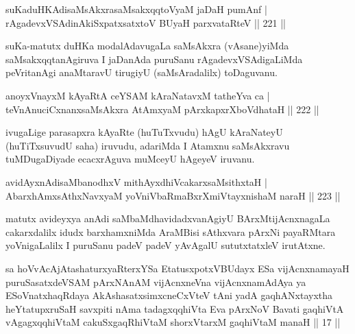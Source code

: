 
\begin{shl}
suKaduHKAdisaMsAkxrasaMsakxqqtoV\s yaM jaDaH pumAnf |\\
rAgadevxVSAdinA\s \s kiSxpatxsatxtoV BUyaH parxvataRteV \hfill || 221 ||
\end{shl}

\begin{artha}
suKa-matutx duHKa modalAdavugaLa saMsAkxra (vAsane)yiMda saMsakxqqtanAgiruva I jaDanAda puruSanu rAgadevxVSAdigaLiMda peVritanAgi anaMtaravU tirugiyU (saMsAradalilx) toDaguvanu.
\end{artha}

\begin{shl}
anoyxVnayxM kAyaRtA ceYSAM kAraNatavxM tatheYva ca |\\
teVnAnuciCxnanxsaMsAkxra AtAmx\s yaM pArxkapxrXboVdhataH \hfill || 222 ||
\end{shl}

\begin{artha}
ivugaLige parasapxra kAyaRte (huTuTxvudu) hAgU kAraNateyU (huTiTxsuvudU saha) iruvudu, adariMda I Atamxnu saMsAkxravu tuMDugaDiyade ecacxrAguva muMceyU hAgeyeV iruvanu.
\end{artha}

\begin{shl}
avidAyxnAdisaMbanodhxV mithAyxdhiVcakarxsaMsithxtaH |\\
AbarxhAmx\s \s sAthxNavxyaM yoVniVbaRmaBxrXmiVtayxnishaM naraH \hfill || 223 ||
\end{shl}

\begin{artha}
matutx avideyxya anAdi saMbaMdhavidadxvanAgiyU BArxMtijAcnxnagaLa cakarxdalilx idudx barxhamxniMda AraMBisi sAthxvara pArxNi payaRMtara yoVnigaLalilx I puruSanu padeV padeV yAvAgalU sututxtatxleV irutAtxne.
\end{artha}


\begin{kandikeshl}
sa hoVvAcAjAtashaturxyaRterxYSa EtatusxpotxV\s BUdayx ESa vijAcnxnamayaH puruSasatxdeVSAM pArxNAnAM vijAcnxneVna vijAcnxnamAdAya ya ESoV\s natxhaqRdaya AkAshasatxsimxcneCxVteV tAni yadA gaqhANxtayxtha heYtatupxruSaH savxpiti nAma tadagxqqhiVta Eva pArxNoV Bavati gaqhiVtA vAgagxqqhiVtaM cakuSxgaqRhiVtaM shorxVtarxM gaqhiVtaM manaH || 17 ||
\end{kandikeshl}

